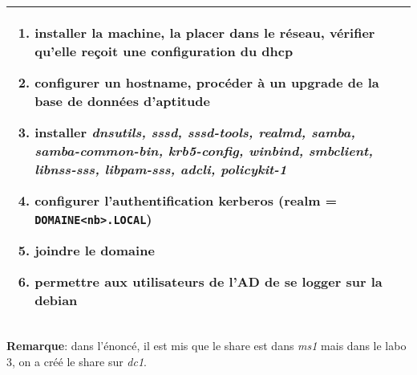 \documentclass[a4paper]{article}
\begin{document}
\begin{center}
\begin{tabular}{|p{7.5cm}|p{7.5cm}|}
        \multicolumn{2}{|p{15cm}|}{
            \begin{enumerate}
                \item installer la machine, la placer dans le réseau, vérifier qu'elle reçoit une configuration du dhcp
                \item configurer un hostname, procéder à un upgrade de la base de données d'aptitude
                \item installer \textit{dnsutils, sssd, sssd-tools, realmd, samba, samba-common-bin, krb5-config, winbind, smbclient, libnss-sss, libpam-sss, adcli, policykit-1}
                \item configurer l'authentification kerberos (realm = \texttt{DOMAINE<nb>.LOCAL})
                \item joindre le domaine
                \item permettre aux utilisateurs de l’AD de se logger sur la debian
            \end{enumerate}
        }

        \\ \hline

    \end{tabular}
\end{center}
\textbf{Remarque}: dans l'énoncé, il est mis que le share est dans \textit{ms1} mais dans le labo 3, on a créé le share sur \textit{dc1}.
\end{document}

